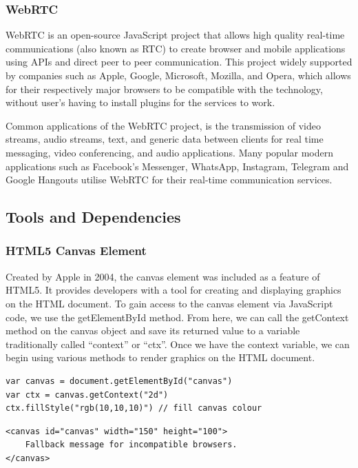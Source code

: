 \subsubsection{WebRTC}
WebRTC is an open-source JavaScript project that allows high quality real-time communications (also known as RTC) to create browser and mobile applications using APIs and direct peer to peer communication. This project widely supported by companies such as Apple, Google, Microsoft, Mozilla, and Opera, which allows for their respectively major browsers to be compatible with the technology, without user’s having to install plugins for the services to work. 

Common applications of the WebRTC project, is the transmission of video streams, audio streams, text, and generic data between clients for real time messaging, video conferencing, and audio applications. Many popular modern applications such as Facebook’s Messenger, WhatsApp, Instagram, Telegram and Google Hangouts utilise WebRTC for their real-time communication services.


\subsection{Tools and Dependencies}
\subsubsection{HTML5 Canvas Element} 
\label{canvasSection}
Created by Apple in 2004, the canvas element was included as a feature of HTML5. It provides developers with a tool for creating and displaying graphics on the HTML document. To gain access to the canvas element via JavaScript code, we use the getElementById method. From here, we can call the getContext method on the canvas object and save its returned value to a variable traditionally called “context” or “ctx”. Once we have the context variable, we can begin using various methods to render graphics on the HTML document.  

\begin{verbatim}
var canvas = document.getElementById("canvas")
var ctx = canvas.getContext("2d")
ctx.fillStyle("rgb(10,10,10)") // fill canvas colour
\end{verbatim}
\begin{verbatim}
<canvas id="canvas" width="150" height="100"> 
    Fallback message for incompatible browsers. 
</canvas>
\end{verbatim}

